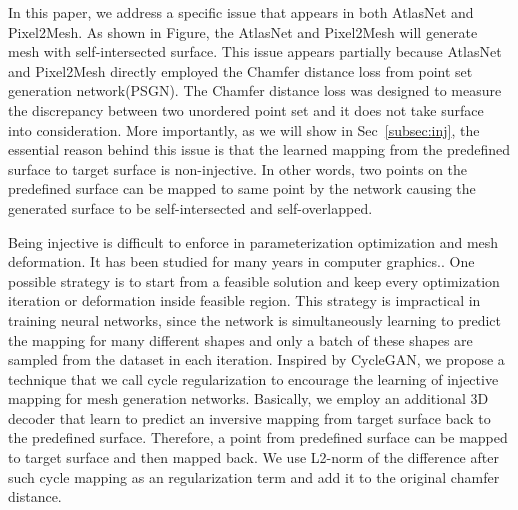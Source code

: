 In this paper, we address a specific issue that appears in both AtlasNet\cite{atlasnet} and Pixel2Mesh\cite{pixel2mesh}. As shown in Figure, the AtlasNet and Pixel2Mesh will generate mesh with self-intersected surface. This issue appears partially because AtlasNet and Pixel2Mesh directly employed the Chamfer distance loss from point set generation network(PSGN)\cite{PSGN}. The Chamfer distance loss was designed to measure the discrepancy between two unordered point set and it does not take surface into consideration. More importantly, as we will show in Sec~\ref{subsec:inj}, the essential reason behind this issue is that the learned mapping from the predefined surface to target surface is non-injective. In other words, two points on the predefined surface can be mapped to same point by the network causing the generated surface to be self-intersected and self-overlapped. 

Being injective is difficult to enforce in parameterization optimization and mesh deformation. It has been studied for many years in computer graphics.. One possible strategy is to start from a feasible solution and keep every optimization iteration or deformation inside feasible region. This strategy is impractical in training neural networks, since the network is simultaneously learning to predict the mapping for many different shapes and only a batch of these shapes are sampled from the dataset in each iteration. Inspired by CycleGAN\cite{CycleGAN}, we propose a technique that we call cycle regularization to encourage the learning of injective mapping for mesh generation networks. Basically, we employ an additional 3D decoder that learn to predict an inversive mapping from target surface back to the predefined surface. Therefore, a point from predefined surface can be mapped to target surface and then mapped back. We use 
L2-norm of the difference after such cycle mapping as an regularization term and add it to the original chamfer distance.
 